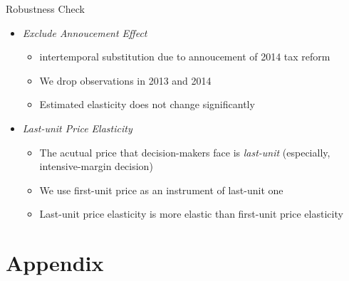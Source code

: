 \documentclass[
  ignorenonframetext,
  aspectratio=169,
]{beamer}
\providecommand{\tightlist}{%
  \setlength{\itemsep}{0pt}\setlength{\parskip}{0pt}}
\begin{document}
\begin{frame}{Robustness Check}
\protect\hypertarget{robustness-check}{}
\begin{itemize}
\tightlist
\item
  \emph{Exclude Annoucement Effect}

  \begin{itemize}
  \tightlist
  \item
    intertemporal substitution due to annoucement of 2014 tax reform
  \item
    We drop observations in 2013 and 2014
  \item
    Estimated elasticity does not change significantly
  \end{itemize}
\item
  \emph{Last-unit Price Elasticity}

  \begin{itemize}
  \tightlist
  \item
    The acutual price that decision-makers face is \emph{last-unit}
    (especially, intensive-margin decision)
  \item
    We use first-unit price as an instrument of last-unit one
  \item
    Last-unit price elasticity is more elastic
    than first-unit price elasticity
  \end{itemize}
\end{itemize}
\end{frame}

\hypertarget{appendix}{%
\section{Appendix}\label{appendix}}
\end{document}

